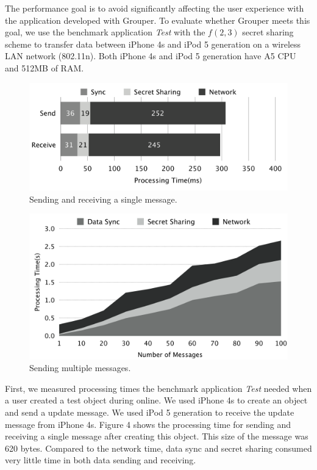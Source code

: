 \documentclass[twocolumn,10pt]{article}
\begin{document}
The performance goal is to avoid significantly affecting the user experience with the application developed with Grouper. 
To evaluate whether Grouper meets this goal, we use the benchmark application \emph{Test} with the $f(2, 3)$ secret sharing scheme to transfer data between iPhone 4s and iPod 5 generation on a wireless LAN network (802.11n). 
Both iPhone 4s and iPod 5 generation have A5 CPU and 512MB of RAM.

\begin{figure}[t]
	\centering
	\includegraphics[scale=0.12]{processing1}
	\caption{Sending and receiving a single message.}
\end{figure}

\begin{figure}[t]
	\centering
	\includegraphics[scale=0.12]{processing2}
	\caption{Sending multiple messages.}
\end{figure}

First, we measured processing times the benchmark application \emph{Test} needed when a user created a test object during online. 
We used iPhone 4s to create an object and send a update message. 
We used iPod 5 generation to receive the update message from iPhone 4s.
Figure 4 shows the processing time for sending and receiving a single message after creating this object.
This size of the message was 620 bytes.
Compared to the network time, data sync and secret sharing consumed very little time in both data sending and receiving.
\end{document}
